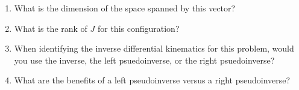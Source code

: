 \documentclass{16384_doc} %
\begin{document}
\begin{questions}
\begin{enumerate} [label=\alph*.]
        \begin{tcolorbox}[height=3cm]
        \end{tcolorbox}
        
        \item \text{[2 points]} What is the dimension of the space spanned by this vector?
        \begin{tcolorbox}[height=3cm]
        \end{tcolorbox}
        
        \item \text{[1 point]} What is the rank of $J$ for this configuration?
        \begin{tcolorbox}[height=3cm]
        \end{tcolorbox}
        
        \item \text{[1 point]} When identifying the inverse differential kinematics for this
        problem, would you use the inverse, the left psuedoinverse, or the right
        psuedoinverse?
        \begin{tcolorbox}[height=3cm]
        \end{tcolorbox}
        
        \item \text{[3 points]} What are the benefits of a left pseudoinverse versus a right
        pseudoinverse?
        \begin{tcolorbox}[height=3cm]
        \end{tcolorbox}
        
    \end{enumerate}


\end{questions}
\end{document}
